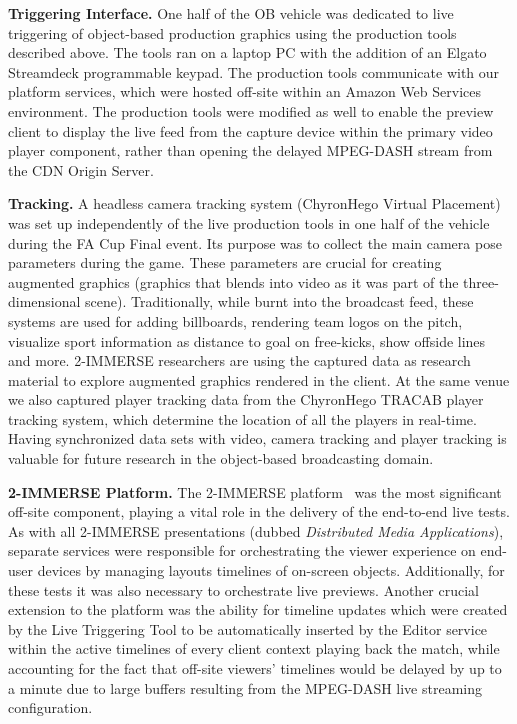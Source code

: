 \documentclass[sigchi-a, authorversion]{acmart}
\begin{document}
\vspace{5pt}\noindent\textbf{Triggering Interface.} One half of the OB vehicle was dedicated to live
triggering of object-based production graphics using the production tools
described above. The tools ran on a laptop PC with the addition of an Elgato
Streamdeck programmable keypad. The production tools communicate with our
platform services, which were hosted off-site within an Amazon Web Services
environment. The production tools were modified as well to enable the preview
client to display the live feed from the capture device within the primary video
player component, rather than opening the delayed MPEG-DASH stream from the CDN
Origin Server.

\vspace{5pt}\noindent\textbf{Tracking.} A headless camera tracking system
(ChyronHego Virtual Placement) was set up independently of the live production
tools in one half of the vehicle during the FA Cup Final event. Its purpose was
to collect the main camera pose parameters during the game. These parameters
are crucial for creating augmented graphics (graphics that blends into video as
it was part of the three-dimensional scene). Traditionally, while burnt into
the broadcast feed, these systems are used for adding billboards, rendering
team logos on the pitch, visualize sport information as distance to goal on
free-kicks, show offside lines and more. 2-IMMERSE researchers are using the
captured data as research material to explore augmented graphics rendered in
the client. At the same venue we also captured player tracking data from the
ChyronHego TRACAB player tracking system, which determine the location of all
the players in real-time. Having synchronized data sets with video, camera
tracking and player tracking is valuable for future research in the object-based
broadcasting domain.

\vspace{5pt}\noindent\textbf{2-IMMERSE Platform.} The 2-IMMERSE
platform~\cite{jansen2018, kegel2017} was the most significant off-site
component, playing a vital role in the delivery of the end-to-end live
tests. As with all 2-IMMERSE presentations (dubbed \emph{Distributed Media
Applications}), separate services were responsible for orchestrating the viewer experience on
end-user devices by managing layouts timelines of on-screen objects.
Additionally, for these tests it was also necessary
to orchestrate live previews. Another crucial extension to the platform
was the ability for timeline updates which were created by the Live Triggering
Tool to be automatically inserted by the Editor service within the active
timelines of every client context playing back the match, while accounting
for the fact that off-site viewers' timelines would be delayed by up to a minute
due to large buffers resulting from the MPEG-DASH live streaming configuration.
\end{document}
